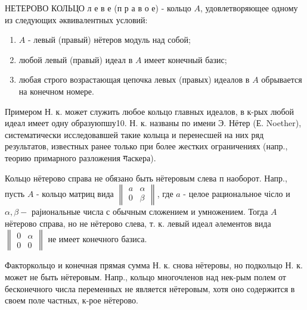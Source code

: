 \documentclass[10pt]{article}
\begin{document}
НЕТЕРОВО КОЛЬЦО л е в е (п р а в о е) - кольцо $A$, удовлетворяющее одному из следующих әквивалентных условий:



\begin{enumerate}

  \item $A$ - левый (правый) нётеров модуль над собой;



  \item любой левый (правый) идеал в $A$ имеет конечный базис;



  \item любая строго возрастающая цепочка левых (правых) идеалов в $A$ обрывается на конечном номере.



\end{enumerate}



Примером Н. к. может служить любое кольцо главных идеалов, в к-рых любой идеал имеет одну образуюпшу10. Н. к. названы по имени Э. Нётер (Е. Noether), систематически исследовавшей такие колыца и перенесшей на них ряд результатов, известных ранее только при более жестких ограничениях (напр., теорию примарного разложения गаскера).



Кольцо нётерово справа не обязано быть нётеровым слева п наоборот. Напр., пусть $A$ - кольцо матриц вида $\left\|\begin{array}{ll}a & \alpha \\ 0 & \beta\end{array}\right\|$, где $a$ - целое рациональное чісло и $\alpha, \beta-$ рајиональные числа с обычным сложением и умножением. Тогда $A$ нётерово справа, но не нётерово слева, т. к. левый идеал әлементов вида $\left\|\begin{array}{ll}0 & \alpha \\ 0 & 0\end{array}\right\|$ не имеет конечного базиса.



Факторкольцо и конечная прямая сумма Н. к. снова нётеровы, но подкольцо Н. к. может не быть нётеровым. Напр., кольцо многочленов над нек-рым полем от бесконечного числа переменных не является нётеровым, хотя оно содержится в своем поле частных, к-рое нётерово.
\end{document}
